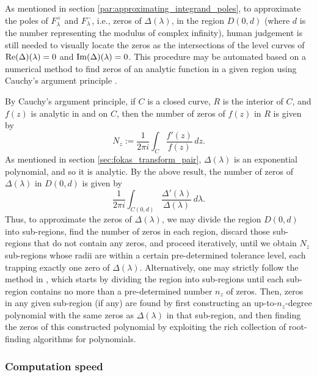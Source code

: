 \documentclass[12pt, oneside, a4paper]{article}
\begin{document}
As mentioned in section \ref{par:approximating_integrand_poles}, to approximate the poles of $F^+_\lambda$ and $F^-_\lambda$, i.e., zeros of $\Delta(\lambda)$, in the region $D(0,d)$ (where $d$ is the number representing the modulus of complex infinity), human judgement is still needed to visually locate the zeros as the intersections of the level curves of $\mathrm{Re}(\Delta)(\lambda)=0$ and $\mathrm{Im}(\Delta)(\lambda)=0$. This procedure may be automated based on a numerical method to find zeros of an analytic function in a given region using Cauchy's argument principle \cite{Delves1967}.

By Cauchy's argument principle, if $C$ is a closed curve, $R$ is the interior of $C$, and $f(z)$ is analytic in and on $C$, then the number of zeros of $f(z)$ in $R$ is given by
\[N_z := \frac{1}{2\pi i}\int_C \frac{f'(z)}{f(z)}\,dz.\]
As mentioned in section \ref{sec:fokas_transform_pair}, $\Delta(\lambda)$ is an exponential polynomial, and so it is analytic. By the above result, the number of zeros of $\Delta(\lambda)$ in $D(0,d)$ is given by
\[\frac{1}{2\pi i}\int_{C(0,d)} \frac{\Delta'(\lambda)}{\Delta(\lambda)}\,d\lambda.\]
Thus, to approximate the zeros of $\Delta(\lambda)$, we may divide the region $D(0,d)$ into sub-regions, find the number of zeros in each region, discard those sub-regions that do not contain any zeros, and proceed iteratively, until we obtain $N_z$ sub-regions whose radii are within a certain pre-determined tolerance level, each trapping exactly one zero of $\Delta(\lambda)$. Alternatively, one may strictly follow the method in \cite{Delves1967}, which starts by dividing the region into sub-regions until each sub-region contains no more than a pre-determined number $n_z$ of zeros. Then, zeros in any given sub-region (if any) are found by first constructing an up-to-$n_z$-degree polynomial with the same zeros as $\Delta(\lambda)$ in that sub-region, and then finding the zeros of this constructed polynomial by exploiting the rich collection of root-finding algorithms for polynomials.

\subsubsection{Computation speed}
\end{document}
